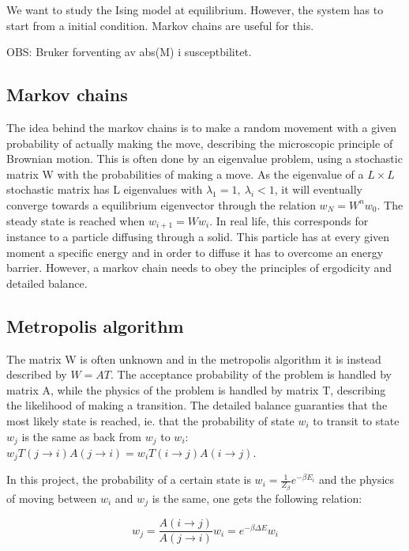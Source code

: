 

We want to study the Ising model at equilibrium. However, the system has to start from a initial condition. Markov chains are useful for this.


	
	OBS: Bruker forventing av abs(M) i susceptbilitet. 


\subsection{Markov chains}

The idea behind the markov chains is to make a random movement with a given probability of actually making the move, describing the microscopic principle of Brownian motion. This is often done by an eigenvalue problem, using a stochastic matrix W with the probabilities of making a move. As the eigenvalue of a $ L\times L $ stochastic matrix has  L eigenvalues with $ \lambda_1 = 1, \  \lambda_i <1$, it will eventually converge towards a equilibrium eigenvector through the relation $ w_N = W^nw_0 $. The steady state is reached when $ w_{i+1} = Ww_{i} $.
In real life, this corresponds for instance to a particle diffusing through a solid. This particle  has at every given moment a specific energy and in order to diffuse it has to overcome an energy barrier. However, a markov chain needs to obey the principles of ergodicity and detailed balance. 


\subsection{Metropolis algorithm}
The matrix W is often unknown and in the metropolis algorithm it is instead described by $ W =AT $. The acceptance probability of the problem is handled by matrix A, while the physics of the problem is handled by matrix T, describing  the likelihood of making a transition. The detailed balance guaranties that the most likely state is reached, ie. that the probability of state $ w_i $ to transit to state $ w_j $ is the same as back from $ w_j $ to $ w_i $: 
$ w_jT(j\rightarrow i) A(j\rightarrow i) = w_iT(i\rightarrow j) A(i\rightarrow j)$. 

In this project, the probability of a certain state is $ w_i = \frac{1}{Z_{\beta}} e^{-\beta E_i} $ and the  physics of moving between $ w_i $ and $ w_j $ is the same, one gets the following relation:

\begin{equation}\label{eq_w_j}
w_j = \frac{A(i\rightarrow j)}{A(j\rightarrow i) } w_i = e^{-\beta \Delta E} w_i
\end{equation}

